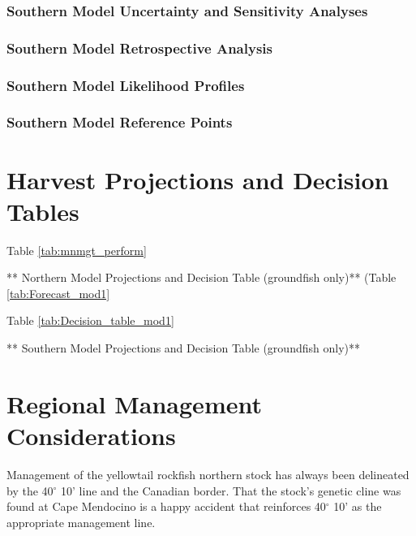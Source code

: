 \documentclass[12pt,]{article}
\begin{document}
\subsubsection{Southern Model Uncertainty and Sensitivity
Analyses}\label{southern-model-uncertainty-and-sensitivity-analyses}

\subsubsection{Southern Model Retrospective
Analysis}\label{southern-model-retrospective-analysis}

\subsubsection{Southern Model Likelihood
Profiles}\label{southern-model-likelihood-profiles}

\subsubsection{Southern Model Reference
Points}\label{southern-model-reference-points}

\newpage

\section{Harvest Projections and Decision
Tables}\label{harvest-projections-and-decision-tables}

Table \ref{tab:mnmgt_perform}

** Northern Model Projections and Decision Table (groundfish only)**
(Table \ref{tab:Forecast_mod1}

Table \ref{tab:Decision_table_mod1}

** Southern Model Projections and Decision Table (groundfish only)**

\newpage

\section{Regional Management
Considerations}\label{regional-management-considerations}

Management of the yellowtail rockfish northern stock has always been
delineated by the 40\(^\circ\) 10' line and the Canadian border. That
the stock's genetic cline was found at Cape Mendocino is a happy
accident that reinforces 40\(^\circ\) 10' as the appropriate management
line.
\end{document}
